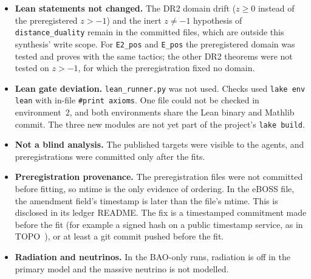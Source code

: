 \documentclass[11pt]{article}
\begin{document}
\begin{itemize}
does not name the change; the three ledgers use three audit schemas; some computed rows carry kind \texttt{citation}; the gate does not check that
an evidence blob belongs to its claim, an empty audit object clears the Tier~A flag, and a Tier~A blob that lists \texttt{sorryAx} passes the gate; all $\tierBTotal$
Tier~B rows are floating-point outputs that Elenchus's own semantics would file at X, and the DR1/DR2 ledger READMEs do not disclose this. The ledgers (including their
\texttt{kind} fields and READMEs) and the Elenchus tool are outside this synthesis' write scope; re-kinding the float rows (e.g.\ a \texttt{float\_harness} kind capped
below B, or refiling at X) belongs in the ledgers themselves. A standard audit schema with \texttt{auditor\_kind}, the audited and current source hashes and the change since audit is
needed in the ledgers themselves.
\item \textbf{Lean statements not changed.} The DR2 domain drift ($z\ge0$ instead of the preregistered $z>-1$) and the inert $z\neq-1$ hypothesis of
\texttt{distance\_duality} remain in the committed files, which are outside this synthesis' write scope. For \texttt{E2\_pos} and \texttt{E\_pos} the preregistered domain
was tested and proves with the same tactics; the other DR2 theorems were not tested on $z>-1$, for which the preregistration fixed no domain.
\item \textbf{Lean gate deviation.} \texttt{lean\_runner.py} was not used. Checks used \texttt{lake env lean} with in-file
\texttt{\#print axioms}. One file could not be checked in environment~2, and both environments share the Lean binary and Mathlib commit. The three new modules are not
yet part of the project's \texttt{lake build}.
\item \textbf{Not a blind analysis.} The published targets were visible to the agents, and preregistrations were committed only after the fits.
\item \textbf{Preregistration provenance.} The preregistration files were not committed before fitting, so mtime is the only evidence of
ordering. In the eBOSS file, the amendment field's timestamp is later than the file's mtime. This is disclosed in its ledger README. The fix is a timestamped
commitment made before the fit (for example a signed hash on a public timestamp service, as in TOPO~\cite{topo2024}), or at least a git commit pushed before the fit.
\item \textbf{Radiation and neutrinos.} In the BAO-only runs, radiation is off in the primary model and the massive neutrino is not modelled.

\end{itemize}
\end{document}

